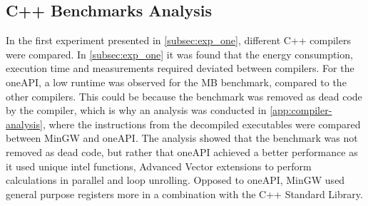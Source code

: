 \subsection{C++ Benchmarks Analysis}

In the first experiment presented in \cref{subsec:exp_one}, different C++ compilers were compared. In \cref{subsec:exp_one} it was found that the energy consumption, execution time and measurements required deviated between compilers. For the oneAPI, a low runtime was observed for the MB benchmark, compared to the other compilers. This could be because the benchmark was removed as dead code by the compiler, which is why an analysis was conducted in \cref{app:compiler-analysis}, where the instructions from the decompiled executables were compared between MinGW and oneAPI. The analysis showed that the benchmark was not removed as dead code, but rather that oneAPI achieved a better performance as it used unique intel functions, Advanced Vector extensions to perform calculations in parallel and loop unrolling. Opposed to oneAPI, MinGW used general purpose registers more in a combination with the C++ Standard Library.  







